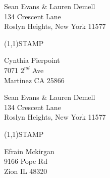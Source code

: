 \documentclass[12pt]{article}
\begin{document}
\pagestyle{empty}
\setlength{\unitlength}{1in}

\begin{minipage}{.5\linewidth}\noindent
Sean Evans \& Lauren Demell \\
134 Crescent Lane \\
Roslyn Heights, New York 11577
\end{minipage}
\begin{minipage}{.5\linewidth \hspace{-.2in} \vspace{-.3in}}
\begin{flushright}
\framebox(1,1){STAMP}
\end{flushright}
\end{minipage}

\begin{center}\begin{Huge}\vspace*{\fill}
Cynthia Pierpoint\\
7071 $2^{nd}$ Ave\\
Martinez CA 25866\\
\vspace{\fill}\end{Huge}\end{center}

\clearpage

\begin{minipage}{.5\linewidth}\noindent
Sean Evans \& Lauren Demell \\
134 Crescent Lane \\
Roslyn Heights, New York 11577
\end{minipage}
\begin{minipage}{.5\linewidth \hspace{-.2in} \vspace{-.3in}}
\begin{flushright}
\framebox(1,1){STAMP}
\end{flushright}
\end{minipage}

\begin{center}\begin{Huge}\vspace*{\fill}
Efrain Mckirgan\\
9166 Pope Rd\\
Zion IL 48320\\
\vspace{\fill}\end{Huge}\end{center}

\clearpage
\end{document}
